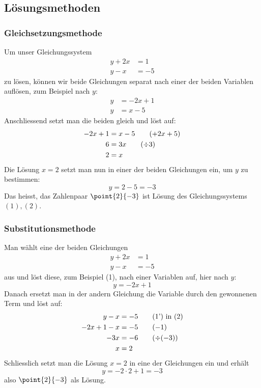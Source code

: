 \documentclass[%
11pt,%
twoside,%
titlepage,%
german,%
headsepline%
]{scrartcl}
\begin{document}
\subsection{L\"osungsmethoden}
\subsubsection{Gleichsetzungsmethode}
Um unser Gleichungssystem
\begin{align}
y+2x&=1\tag{1}\\
y-x&=-5\tag{2}
\end{align}
zu l\"osen, k\"onnen wir beide Gleichungen separat nach einer der beiden Variablen aufl\"osen, zum Beispiel nach $y$:
\begin{align}
y&=-2x+1\tag{$1'$}\\
y&=x-5\tag{$2'$}
\end{align}
Anschliessend setzt man die beiden gleich und l\"ost auf:
\begin{align}
-2x+1&=x-5\tag{$+2x+5$}\\
6&=3x\tag{$\div3$}\\
2&=x\notag
\end{align}
Die L\"osung $x=2$ setzt man nun in einer der beiden Gleichungen ein, um $y$ zu bestimmen:
$$y=2-5=-3$$
Das heisst, das Zahlenpaar $\point{2}{-3}$ ist L\"osung des Gleichungssystems $(1), (2)$.

\subsubsection{Substitutionsmethode}
Man w\"ahlt eine der beiden Gleichungen
\begin{align}
y+2x&=1\tag{1}\\
y-x&=-5\tag{2}
\end{align}
aus und l\"ost diese, zum Beispiel (1), nach einer Variablen auf, hier nach $y$:
\begin{equation}
y=-2x+1\tag{1'}
\end{equation}
Danach ersetzt man in der andern Gleichung die Variable durch den gewonnenen Term und l\"ost auf:
\begin{align}
y-x&=-5\tag{1') in (2}\\
-2x+1-x&=-5\tag{$-1$}\\
-3x&=-6\tag{$\div(-3)$}\\
x&=2\notag
\end{align}
Schliesslich setzt man die L\"osung $x=2$ in eine der Gleichungen ein und erh\"alt
$$y=-2\cdot 2+1=-3$$
also $\point{2}{-3}$ als L\"osung.
\end{document}
